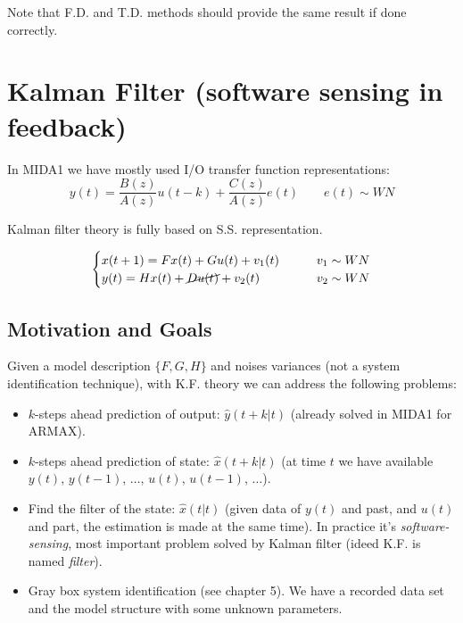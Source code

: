 Note that F.D. and T.D. methods should provide the same result if done correctly.


\chapter{Kalman Filter (software sensing in feedback)}

In MIDA1 we have mostly used I/O transfer function representations:
\[ y(t) = \frac{B(z)}{A(z)}u(t-k) + \frac{C(z)}{A(z)}e(t) \qquad e(t) \sim WN \]


Kalman filter theory is fully based on S.S. representation.

\[
    \begin{cases}
        x(t+1) = Fx(t) + Gu(t) + v_1(t)  & \qquad v_1 \sim WN \\
        y(t) = Hx(t) + \cancel{Du(t)} + v_2(t) & \qquad v_2 \sim WN
    \end{cases}
\]

\section{Motivation and Goals}

Given a model description $\{F, G, H\}$ and noises variances (not a system identification technique), with K.F. theory we can address the following problems:

\begin{itemize}
    \item $k$-steps ahead prediction of output: $\hat{y}(t+k|t)$ (already solved in MIDA1 for ARMAX).
    \item $k$-steps ahead prediction of state: $\hat{x}(t+k|t)$ (at time $t$ we have available $y(t)$, $y(t-1)$, $\ldots$, $u(t)$, $u(t-1)$, $\ldots$).
    \item Find the filter of the state: $\hat{x}(t|t)$ (given data of $y(t)$ and past, and $u(t)$ and part, the estimation is made at the same time). In practice it's \emph{software-sensing}, most important problem solved by Kalman filter (ideed K.F. is named \emph{filter}).
    \item Gray box system identification (see chapter 5). We have a recorded data set and the model structure with some unknown parameters.
\end{itemize}


